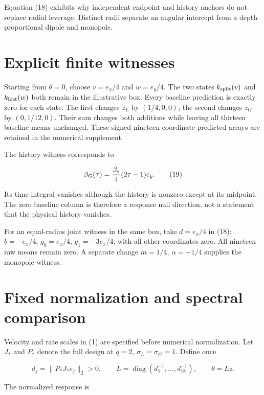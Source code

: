 Equation (18) exhibits why independent endpoint and history anchors do not replace radial leverage. Distinct radii separate an angular intercept from a depth-proportional dipole and monopole.

\hypertarget{explicit-finite-witnesses}{%
\section{Explicit finite witnesses}\label{explicit-finite-witnesses}}

Starting from \(\theta=0\), choose \(v=e_x/4\) and \(w=e_y/4\). The two states \(k_{\rm split}(v)\) and \(k_{\rm hist}(w)\) both remain in the illustrative box. Every baseline prediction is exactly zero for each state. The first changes \(z_L\) by \((1/4,0,0)\); the second changes \(z_G\) by \((0,1/12,0)\). Their sum changes both additions while leaving all thirteen baseline means unchanged. These signed nineteen-coordinate predicted arrays are retained in the numerical supplement.

The history witness corresponds to

\[
\beta_G(\tau)={\beta_*\over4}(2\tau-1)e_y.               \tag{19}
\]

Its time integral vanishes although the history is nonzero except at its midpoint. The zero baseline column is therefore a response null direction, not a statement that the physical history vanishes.

For an equal-radius joint witness in the same box, take \(d=e_x/4\) in (18): \(b=-e_x/4\), \(g_0=e_x/4\), \(g_1=-3e_x/4\), with all other coordinates zero. All nineteen raw means remain zero. A separate change \(m=1/4\), \(\alpha=-1/4\) supplies the monopole witness.

\hypertarget{fixed-normalization-and-spectral-comparison}{%
\section{Fixed normalization and spectral comparison}\label{fixed-normalization-and-spectral-comparison}}

Velocity and rate scales in (1) are specified before numerical normalization. Let \(J_*\) and \(P_*\) denote the full design at \(q=2\), \(\sigma_L=\sigma_G=1\). Define once

\[
d_j=\|P_*J_*e_j\|_2>0,\qquad
L=\operatorname{diag}(d_1^{-1},\ldots,d_{18}^{-1}),\qquad
\theta=Lz.                                             \tag{20}
\]

The normalized response is

